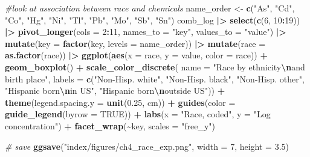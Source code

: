 \documentclass[12pt, twoside]{amherstthesis}
\newenvironment{Shaded}{\begin{snugshade}}{\end{snugshade}}
\newcommand{\AttributeTok}[1]{\textcolor[rgb]{0.13,0.29,0.53}{#1}}
\newcommand{\CommentTok}[1]{\textcolor[rgb]{0.56,0.35,0.01}{\textit{#1}}}
\newcommand{\ConstantTok}[1]{\textcolor[rgb]{0.56,0.35,0.01}{#1}}
\newcommand{\DecValTok}[1]{\textcolor[rgb]{0.00,0.00,0.81}{#1}}
\newcommand{\FloatTok}[1]{\textcolor[rgb]{0.00,0.00,0.81}{#1}}
\newcommand{\FunctionTok}[1]{\textcolor[rgb]{0.13,0.29,0.53}{\textbf{#1}}}
\newcommand{\NormalTok}[1]{#1}
\newcommand{\OtherTok}[1]{\textcolor[rgb]{0.56,0.35,0.01}{#1}}
\newcommand{\SpecialCharTok}[1]{\textcolor[rgb]{0.81,0.36,0.00}{\textbf{#1}}}
\newcommand{\StringTok}[1]{\textcolor[rgb]{0.31,0.60,0.02}{#1}}
\begin{document}
\scriptsize
\begin{Shaded}
\begin{Highlighting}[]
\CommentTok{\#look at association between race and chemicals}
\NormalTok{name\_order }\OtherTok{\textless{}{-}} \FunctionTok{c}\NormalTok{(}\StringTok{"As"}\NormalTok{, }\StringTok{"Cd"}\NormalTok{, }\StringTok{"Co"}\NormalTok{, }\StringTok{"Hg"}\NormalTok{, }\StringTok{"Ni"}\NormalTok{, }\StringTok{"Tl"}\NormalTok{, }\StringTok{"Pb"}\NormalTok{, }\StringTok{"Mo"}\NormalTok{, }\StringTok{"Sb"}\NormalTok{, }\StringTok{"Sn"}\NormalTok{)}
\NormalTok{comb\_log }\SpecialCharTok{|\textgreater{}} 
  \FunctionTok{select}\NormalTok{(}\FunctionTok{c}\NormalTok{(}\DecValTok{6}\NormalTok{, }\DecValTok{10}\SpecialCharTok{:}\DecValTok{19}\NormalTok{)) }\SpecialCharTok{|\textgreater{}} 
  \FunctionTok{pivot\_longer}\NormalTok{(}\AttributeTok{cols =} \DecValTok{2}\SpecialCharTok{:}\DecValTok{11}\NormalTok{, }\AttributeTok{names\_to =} \StringTok{"key"}\NormalTok{, }\AttributeTok{values\_to =} \StringTok{"value"}\NormalTok{) }\SpecialCharTok{|\textgreater{}} 
  \FunctionTok{mutate}\NormalTok{(}\AttributeTok{key =} \FunctionTok{factor}\NormalTok{(key, }\AttributeTok{levels =}\NormalTok{ name\_order)) }\SpecialCharTok{|\textgreater{}} 
  \FunctionTok{mutate}\NormalTok{(}\AttributeTok{race =} \FunctionTok{as.factor}\NormalTok{(race)) }\SpecialCharTok{|\textgreater{}} 
  \FunctionTok{ggplot}\NormalTok{(}\FunctionTok{aes}\NormalTok{(}\AttributeTok{x =}\NormalTok{ race, }\AttributeTok{y =}\NormalTok{ value, }\AttributeTok{color =}\NormalTok{ race)) }\SpecialCharTok{+}
  \FunctionTok{geom\_boxplot}\NormalTok{() }\SpecialCharTok{+}
  \FunctionTok{scale\_color\_discrete}\NormalTok{(}
    \AttributeTok{name =} \StringTok{"Race by ethnicity}\SpecialCharTok{\textbackslash{}n}\StringTok{and birth place"}\NormalTok{, }
    \AttributeTok{labels =} \FunctionTok{c}\NormalTok{(}\StringTok{"Non{-}Hisp. white"}\NormalTok{, }\StringTok{"Non{-}Hisp. black"}\NormalTok{, }\StringTok{"Non{-}Hisp. other"}\NormalTok{, }
               \StringTok{"Hispanic born}\SpecialCharTok{\textbackslash{}n}\StringTok{in US"}\NormalTok{, }\StringTok{"Hispanic born}\SpecialCharTok{\textbackslash{}n}\StringTok{outside US"}\NormalTok{)) }\SpecialCharTok{+} 
  \FunctionTok{theme}\NormalTok{(}\AttributeTok{legend.spacing.y =} \FunctionTok{unit}\NormalTok{(}\FloatTok{0.25}\NormalTok{, }\StringTok{\textquotesingle{}cm\textquotesingle{}}\NormalTok{)) }\SpecialCharTok{+}
  \FunctionTok{guides}\NormalTok{(}\AttributeTok{color =} \FunctionTok{guide\_legend}\NormalTok{(}\AttributeTok{byrow =} \ConstantTok{TRUE}\NormalTok{)) }\SpecialCharTok{+}
  \FunctionTok{labs}\NormalTok{(}\AttributeTok{x =} \StringTok{"Race, coded"}\NormalTok{, }\AttributeTok{y =} \StringTok{"Log concentration"}\NormalTok{) }\SpecialCharTok{+}
  \FunctionTok{facet\_wrap}\NormalTok{(}\SpecialCharTok{\textasciitilde{}}\NormalTok{key, }\AttributeTok{scales =} \StringTok{"free\_y"}\NormalTok{)}

\CommentTok{\# save}
\FunctionTok{ggsave}\NormalTok{(}\StringTok{"index/figures/ch4\_race\_exp.png"}\NormalTok{, }\AttributeTok{width =} \DecValTok{7}\NormalTok{, }\AttributeTok{height =} \FloatTok{3.5}\NormalTok{)}
\end{Highlighting}
\end{Shaded}
\normalsize
\end{document}
